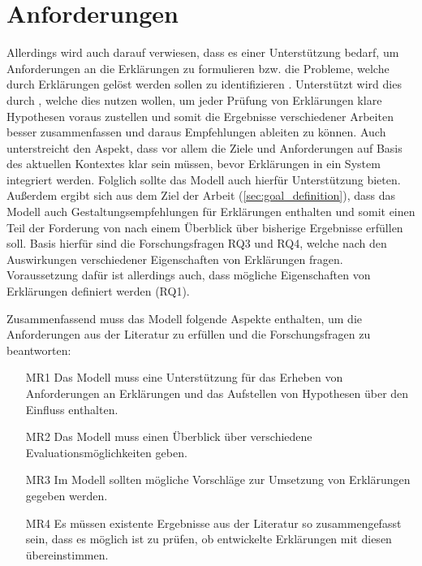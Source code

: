 \section{Anforderungen}

Allerdings wird auch darauf verwiesen, dass es einer Unterstützung bedarf, um Anforderungen an die Erklärungen zu formulieren bzw. die Probleme, welche durch Erklärungen gelöst werden sollen zu identifizieren \cite{chazette_end-users_nodate, doshi2017towards}. Unterstützt wird dies durch \citeauthor{waa_evaluating_2021}, welche dies nutzen wollen, um jeder Prüfung von Erklärungen klare Hypothesen voraus zustellen und somit die Ergebnisse verschiedener Arbeiten besser zusammenfassen und daraus Empfehlungen ableiten zu können. Auch \citeauthor{kohl_explainability_2019} unterstreicht den Aspekt, dass vor allem die Ziele und Anforderungen auf Basis des aktuellen Kontextes klar sein müssen, bevor Erklärungen in ein System integriert werden. Folglich sollte das Modell auch hierfür Unterstützung bieten. Außerdem ergibt sich aus dem Ziel der Arbeit (\autoref{sec:goal_definition}), dass das Modell auch Gestaltungsempfehlungen für Erklärungen enthalten und somit einen Teil der Forderung von \citeauthor{waa_evaluating_2021} nach einem Überblick über bisherige Ergebnisse erfüllen soll. Basis hierfür sind die Forschungsfragen RQ3 und RQ4, welche nach den Auswirkungen verschiedener Eigenschaften von Erklärungen fragen. Voraussetzung dafür ist allerdings auch, dass mögliche Eigenschaften von Erklärungen definiert werden (RQ1).

\smallskip

Zusammenfassend muss das Modell folgende Aspekte enthalten, um die Anforderungen aus der Literatur zu erfüllen und die Forschungsfragen zu beantworten:

\begin{enumerate}
    \item[MR1] Das Modell muss eine Unterstützung für das Erheben von Anforderungen an Erklärungen und das Aufstellen von Hypothesen über den Einfluss enthalten.
    \item[MR2] Das Modell muss einen Überblick über verschiedene Evaluationsmöglichkeiten geben.
    \item[MR3] Im Modell sollten mögliche Vorschläge zur Umsetzung von Erklärungen gegeben werden.
    \item[MR4] Es müssen existente Ergebnisse aus der Literatur so zusammengefasst sein, dass es möglich ist zu prüfen, ob entwickelte Erklärungen mit diesen übereinstimmen.
\end{enumerate}

